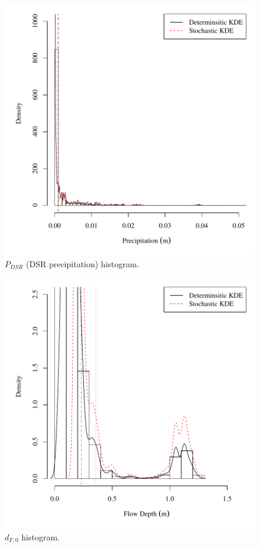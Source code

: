 \begin{center}
\begin{figure}[htbp]
	\includegraphics[width=6in]{"Figures/Results_DSR/V density p"}
	\caption{$P_{DSR}$ (DSR precipitation) histogram.}
\end{figure}
\end{center}
\newpage

\begin{center}
\begin{figure}[htbp]
	\includegraphics[width=6in]{"Figures/Results_DSR/V density depthF1"}
	\caption{$d_{F,0}$ histogram.}
\end{figure}
\end{center}
\newpage

